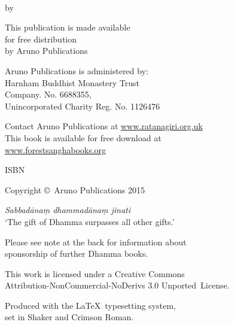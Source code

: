
\cleartoverso
\thispagestyle{empty}

{\copyrightsize
\centering
\setlength{\parindent}{0pt}%
\setlength{\parskip}{0.8\baselineskip}%

\thetitle\\
by \theauthor

This publication is made available\\
for free distribution\\
by Aruno Publications

Aruno Publications is administered by:\\
Harnham Buddhist Monastery Trust\\
Company. No. 6688355,\\
Unincorporated Charity Reg. No. 1126476

Contact Aruno Publications at \href{http://ratanagiri.org.uk/}{www.ratanagiri.org.uk}\\
This book is available for free download at\\
\href{http://forestsanghabooks.org/}{www.forestsanghabooks.org}

ISBN \theISBN

Copyright \copyright\ Aruno Publications 2015

\vfill

\textit{Sabbadānaṃ dhammadānaṃ jinati}\\
‘The gift of Dhamma surpasses all other gifts.’


Please see note at the back for information about\\
sponsorship of further Dhamma books.

This work is licensed under a Creative Commons\\
Attribution-NonCommercial-NoDerivs 3.0 Unported~License.



Produced with the \LaTeX\ typesetting system,\\
set in Shaker and Crimson Roman.

\theEditionInfo

}
